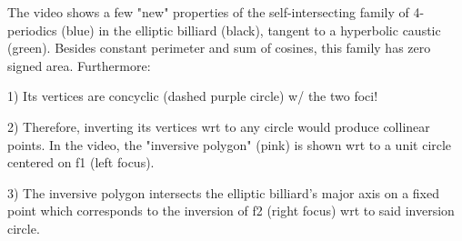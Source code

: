 The video shows a few "new" properties of the self-intersecting family of 4-periodics (blue) in the elliptic billiard (black), tangent to a hyperbolic caustic (green). Besides constant perimeter and sum of cosines, this family has zero signed area. Furthermore:

1) Its vertices are concyclic (dashed purple circle) w/ the two foci! 

2) Therefore,  inverting its vertices wrt to any circle would produce collinear points. In the video, the "inversive polygon" (pink) is shown wrt to a unit circle centered on f1 (left focus). 

3) The inversive polygon intersects the elliptic billiard's major axis on a fixed point which corresponds to the inversion of f2 (right focus) wrt to said inversion circle.
